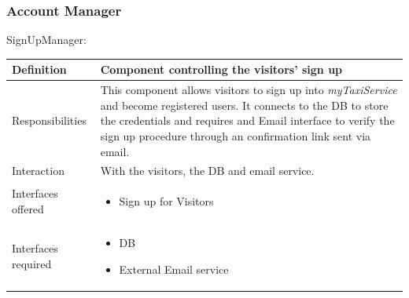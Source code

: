\documentclass[a4paper,11pt]{report} %
\newcommand{\mts}{\mbox{\normalfont\itshape myTaxiService}}
\begin{document}
	\renewcommand{\arraystretch}{1.5}
	\setlength{\tabcolsep}{6pt}
	
		
	\subsubsection{Account Manager}
	\begin{minipage}{\linewidth}
	\end{minipage}
	
	SignUpManager:		
	\begin{center}
		\begin{tabular}{| l | p{9cm} |}\hline
			Definition & Component controlling the visitors' sign up\\\hline
			Responsibilities & This component allows visitors to sign up into \mts{} and become registered users. It connects to the DB to store the credentials and requires and Email interface to verify the sign up procedure through an confirmation link sent via email.\\\hline
			Interaction & With the visitors, the DB and email service.\\\hline
			Interfaces offered & \begin{itemize}
				\item Sign up for Visitors
			\end{itemize}\\\hline
			Interfaces required & \begin{itemize}
				\item DB 
				\item External Email service
			\end{itemize}\\\hline
		\end{tabular}
	\end{center}
	
\end{document}
